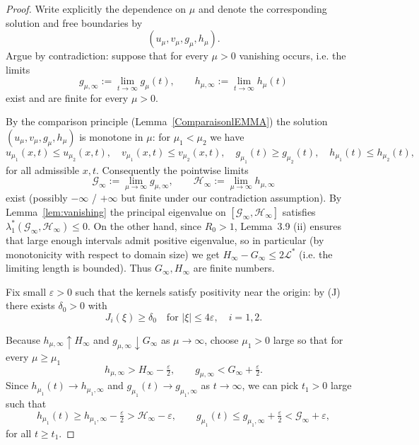 \documentclass[a4paper,11pt]{amsart}
\theoremstyle{definition}
\numberwithin{equation}{section}
\theoremstyle{definition}
\begin{document}
\begin{proof}
Write explicitly the dependence on $\mu$ and denote the corresponding solution and free boundaries by
\[
(u_\mu,v_\mu,g_\mu,h_\mu).
\]
Argue by contradiction: suppose that for every $\mu>0$ vanishing occurs, i.e. the limits
\begin{equation}\label{eq:limits-mu}
g_{\mu,\infty}:=\lim_{t\to\infty} g_\mu(t),\qquad
h_{\mu,\infty}:=\lim_{t\to\infty} h_\mu(t)
\end{equation}
exist and are finite for every $\mu>0$.

By the comparison principle (Lemma~\eqref{ComparaisonlEMMA}) the solution \((u_\mu,v_\mu,g_\mu,h_\mu)\) is monotone in \(\mu\): for \(\mu_1<\mu_2\) we have
\[
u_{\mu_1}(x,t)\leq u_{\mu_2}(x,t),\quad v_{\mu_1}(x,t)\leq v_{\mu_2}(x,t),
\quad g_{\mu_1}(t)\geq g_{\mu_2}(t),\quad h_{\mu_1}(t)\leq h_{\mu_2}(t),
\]
for all admissible \(x,t\). Consequently the pointwise limits
\[
\mathcal{G}_\infty:=\lim_{\mu\to\infty} g_{\mu,\infty},\qquad
\mathcal{H}_\infty:=\lim_{\mu\to\infty} h_{\mu,\infty}
\]
exist (possibly \(-\infty\) / \(+\infty\) but finite under our contradiction assumption). By Lemma~\eqref{lem:vanishing} the principal eigenvalue on \([\mathcal{G}_\infty, \mathcal{H}_\infty]\) satisfies \(\lambda^\ast_1(\mathcal{G}_\infty, \mathcal{H}_\infty)\leq 0\). On the other hand, since \(R_0>1\), Lemma~3.9 (ii) ensures that large enough intervals admit positive eigenvalue, so in particular (by monotonicity with respect to domain size) we get \(H_\infty-G_\infty\leq 2\mathcal L^\ast\) (i.e. the limiting length is bounded). Thus \(G_\infty, H_\infty\) are finite numbers.

Fix small \(\varepsilon>0\) such that the kernels satisfy positivity near the origin: by (J) there exists \(\delta_0>0\) with
\[
J_i(\xi)\ge\delta_0\quad\text{for }|\xi|\le 4\varepsilon,\quad i=1,2.
\]

Because \(h_{\mu,\infty}\uparrow H_\infty\) and \(g_{\mu,\infty}\downarrow G_\infty\) as \(\mu\to\infty\), choose \(\mu_1>0\) large so that for every \(\mu\ge\mu_1\)
\[
h_{\mu,\infty} > H_\infty - \tfrac{\varepsilon}{2},\qquad
g_{\mu,\infty} < G_\infty + \tfrac{\varepsilon}{2}.
\]
Since \(h_{\mu_1}(t)\to h_{\mu_1,\infty}\) and \(g_{\mu_1}(t)\to g_{\mu_1,\infty}\) as \(t\to\infty\), we can pick \(t_1>0\) large such that
\[
h_{\mu_1}(t)\geq h_{\mu_1,\infty}-\tfrac{\varepsilon}{2} > \mathcal{H}_\infty - \varepsilon,\qquad
g_{\mu_1}(t)\leq g_{\mu_1,\infty}+\tfrac{\varepsilon}{2} < \mathcal{G}_\infty +\varepsilon,
\]
for all \(t\geq t_1\).


\end{proof}
\end{document}
